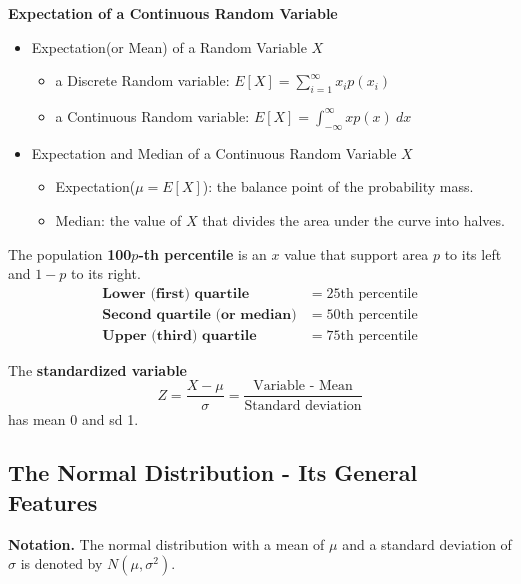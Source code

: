 \documentclass[12pt,openany]{book}
\theoremstyle{definition}
\begin{document}
	\begin{tcolorbox}[colback=white]
		\begin{center}
			\textbf{Expectation of a Continuous Random Variable}
		\end{center}\begin{itemize}
			\item Expectation(or Mean) of a Random Variable $X$\begin{itemize}
				\item a Discrete Random variable: $E[X]=\sum_{i=1}^\infty x_ip(x_i)$
				\item a Continuous Random variable: $E[X]=\int_{-\infty}^\infty xp(x)\ dx$
			\end{itemize}
			\item Expectation and Median of a Continuous Random Variable $X$\begin{itemize}
				\item Expectation($\mu=E[X]$): the balance point of the probability mass.
				\item Median: the value of $X$ that divides the area under the curve into halves.
			\end{itemize}
		\end{itemize}
	\end{tcolorbox}
	\begin{tcolorbox}[colback=white]
		The population \textbf{100$p$-th percentile} is an $x$ value that support area $p$ to its left and $1-p$ to its right. \begin{align*}
			\textbf{Lower (first) quartile} &= 25\text{th percentile} \\
			\textbf{Second quartile (or median)} &= 50\text{th percentile} \\
			\textbf{Upper (third) quartile} &= 75\text{th percentile}
		\end{align*}
	\end{tcolorbox}
	
	\begin{tcolorbox}[colback=white]
		The \textbf{standardized variable} \[
		Z = \frac{X-\mu}{\sigma}=\frac{\text{Variable - Mean}}{\text{Standard deviation}}
		\] has mean $0$ and sd 1.
	\end{tcolorbox}
	
	\subsection{The Normal Distribution - Its General Features}
	
	\begin{tcolorbox}[colback=white]
		\textbf{Notation.} The normal distribution with a mean of $\mu$ and a standard deviation of $\sigma$ is denoted by $N(\mu,\sigma^2)$.
	\end{tcolorbox}
	
\end{document}
